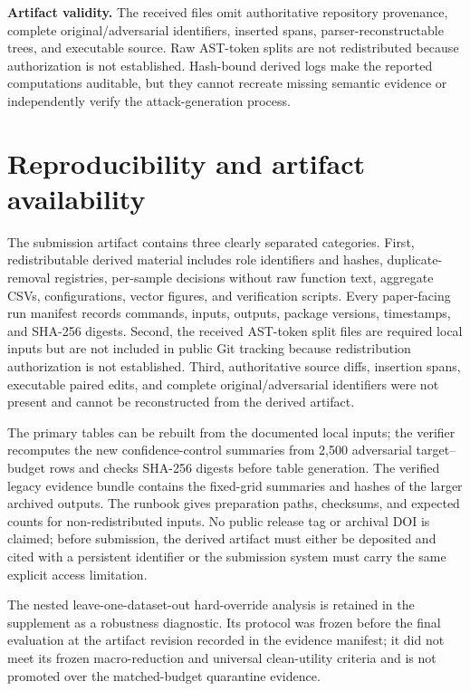 \documentclass[a4paper,fleqn]{cas-dc}
\begin{document}
\textbf{Artifact validity.} The received files omit authoritative repository provenance, complete original/adversarial identifiers, inserted spans, parser-reconstructable trees, and executable source. Raw AST-token splits are not redistributed because authorization is not established. Hash-bound derived logs make the reported computations auditable, but they cannot recreate missing semantic evidence or independently verify the attack-generation process.

\section{Reproducibility and artifact availability}\label{sec:artifact}

The submission artifact contains three clearly separated categories. First, redistributable derived material includes role identifiers and hashes, duplicate-removal registries, per-sample decisions without raw function text, aggregate CSVs, configurations, vector figures, and verification scripts. Every paper-facing run manifest records commands, inputs, outputs, package versions, timestamps, and SHA-256 digests. Second, the received AST-token split files are required local inputs but are not included in public Git tracking because redistribution authorization is not established. Third, authoritative source diffs, insertion spans, executable paired edits, and complete original/adversarial identifiers were not present and cannot be reconstructed from the derived artifact.

The primary tables can be rebuilt from the documented local inputs; the verifier recomputes the new confidence-control summaries from 2,500 adversarial target--budget rows and checks SHA-256 digests before table generation. The verified legacy evidence bundle contains the fixed-grid summaries and hashes of the larger archived outputs. The runbook gives preparation paths, checksums, and expected counts for non-redistributed inputs. No public release tag or archival DOI is claimed; before submission, the derived artifact must either be deposited and cited with a persistent identifier or the submission system must carry the same explicit access limitation.

The nested leave-one-dataset-out hard-override analysis is retained in the supplement as a robustness diagnostic. Its protocol was frozen before the final evaluation at the artifact revision recorded in the evidence manifest; it did not meet its frozen macro-reduction and universal clean-utility criteria and is not promoted over the matched-budget quarantine evidence.
\end{document}
